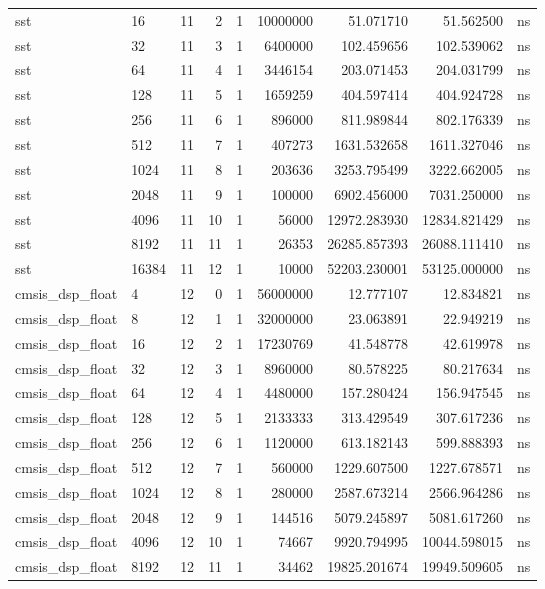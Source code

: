 \begin{tabular}{llrrrrrrl}
sst & 16 & 11 & 2 & 1 & 10000000 & 51.071710 & 51.562500 & ns \\
sst & 32 & 11 & 3 & 1 & 6400000 & 102.459656 & 102.539062 & ns \\
sst & 64 & 11 & 4 & 1 & 3446154 & 203.071453 & 204.031799 & ns \\
sst & 128 & 11 & 5 & 1 & 1659259 & 404.597414 & 404.924728 & ns \\
sst & 256 & 11 & 6 & 1 & 896000 & 811.989844 & 802.176339 & ns \\
sst & 512 & 11 & 7 & 1 & 407273 & 1631.532658 & 1611.327046 & ns \\
sst & 1024 & 11 & 8 & 1 & 203636 & 3253.795499 & 3222.662005 & ns \\
sst & 2048 & 11 & 9 & 1 & 100000 & 6902.456000 & 7031.250000 & ns \\
sst & 4096 & 11 & 10 & 1 & 56000 & 12972.283930 & 12834.821429 & ns \\
sst & 8192 & 11 & 11 & 1 & 26353 & 26285.857393 & 26088.111410 & ns \\
sst & 16384 & 11 & 12 & 1 & 10000 & 52203.230001 & 53125.000000 & ns \\
cmsis\_dsp\_float & 4 & 12 & 0 & 1 & 56000000 & 12.777107 & 12.834821 & ns \\
cmsis\_dsp\_float & 8 & 12 & 1 & 1 & 32000000 & 23.063891 & 22.949219 & ns \\
cmsis\_dsp\_float & 16 & 12 & 2 & 1 & 17230769 & 41.548778 & 42.619978 & ns \\
cmsis\_dsp\_float & 32 & 12 & 3 & 1 & 8960000 & 80.578225 & 80.217634 & ns \\
cmsis\_dsp\_float & 64 & 12 & 4 & 1 & 4480000 & 157.280424 & 156.947545 & ns \\
cmsis\_dsp\_float & 128 & 12 & 5 & 1 & 2133333 & 313.429549 & 307.617236 & ns \\
cmsis\_dsp\_float & 256 & 12 & 6 & 1 & 1120000 & 613.182143 & 599.888393 & ns \\
cmsis\_dsp\_float & 512 & 12 & 7 & 1 & 560000 & 1229.607500 & 1227.678571 & ns \\
cmsis\_dsp\_float & 1024 & 12 & 8 & 1 & 280000 & 2587.673214 & 2566.964286 & ns \\
cmsis\_dsp\_float & 2048 & 12 & 9 & 1 & 144516 & 5079.245897 & 5081.617260 & ns \\
cmsis\_dsp\_float & 4096 & 12 & 10 & 1 & 74667 & 9920.794995 & 10044.598015 & ns \\
cmsis\_dsp\_float & 8192 & 12 & 11 & 1 & 34462 & 19825.201674 & 19949.509605 & ns \\

\end{tabular}
